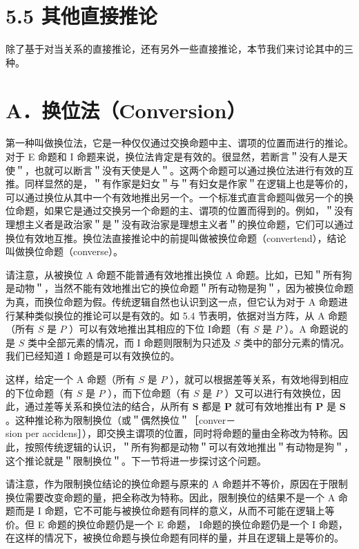 \section*{5.5 其他直接推论}
除了基于对当关系的直接推论，还有另外一些直接推论，本节我们来讨论其中的三种。

\section*{A．换位法（Conversion）}
第一种叫做换位法，它是一种仅仅通过交换命题中主、谓项的位置而进行的推论。对于 E 命题和 I 命题来说，换位法肯定是有效的。很显然，若断言＂没有人是天使＂，也就可以断言＂没有天使是人＂。这两个命题可以通过换位法进行有效的互推。同样显然的是，＂有作家是妇女＂与＂有妇女是作家＂在逻辑上也是等价的，可以通过换位从其中一个有效地推出另一个。一个标准式直言命题叫做另一个的换位命题，如果它是通过交换另一个命题的主、谓项的位置而得到的。例如，＂没有理想主义者是政治家＂是＂没有政治家是理想主义者＂的换位命题，它们可以通过换位有效地互推。换位法直接推论中的前提叫做被换位命题（convertend），结论叫做换位命题（converse）。

请注意，从被换位 A 命题不能普通有效地推出换位 A 命题。比如，已知＂所有狗是动物＂，当然不能有效地推出它的换位命题＂所有动物是狗＂，因为被换位命题为真，而换位命题为假。传统逻辑自然也认识到这一点，但它认为对于 A 命题进行某种类似换位的推论可以是有效的。如 5.4 节表明，依据对当方阵，从 A 命题（所有 $S$ 是 $P$ ）可以有效地推出其相应的下位 I命题（有 $S$ 是 $P$ ）。A 命题说的是 $S$ 类中全部元素的情况，而 I 命题则限制为只述及 $S$ 类中的部分元素的情况。我们已经知道 I 命题是可以有效换位的。

这样，给定一个 A 命题（所有 $S$ 是 $P$ ），就可以根据差等关系，有效地得到相应的下位命题（有 $S$ 是 $P$ ），而下位命题（有 $S$ 是 $P$ ）又可以进行有效换位，因此，通过差等关系和换位法的结合，从所有 $\boldsymbol{S}$ 都是 $\boldsymbol{P}$ 就可有效地推出有 $\boldsymbol{P}$ 是 $\boldsymbol{S}$ 。这种推论称为限制换位（或＂偶然换位＂［conver－\\
sion per accidens］），即交换主谓项的位置，同时将命题的量由全称改为特称。因此，按照传统逻辑的认识，＂所有狗都是动物＂可以有效地推出＂有动物是狗＂，这个推论就是＂限制换位＂。下一节将进一步探讨这个问题。

请注意，作为限制换位结论的换位命题与原来的 A 命题并不等价，原因在于限制换位需要改变命题的量，把全称改为特称。因此，限制换位的结果不是一个 A 命题而是 I 命题，它不可能与被换位命题有同样的意义，从而不可能在逻辑上等价。但 E 命题的换位命题仍是一个 E 命题， I命题的换位命题仍是一个 I 命题，在这样的情况下，被换位命题与换位命题有同样的量，并且在逻辑上是等价的。

